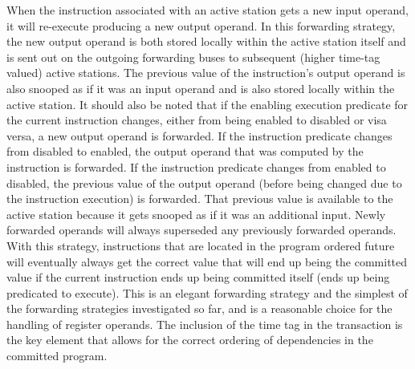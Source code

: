 \documentclass[10pt,dvips]{article}
\begin{document}
When the instruction associated with an active station gets
a new input operand, it will re-execute producing a new
output operand.  In this forwarding strategy, the new output
operand is both stored locally within the active station itself
and is sent out on the outgoing forwarding buses
to subsequent (higher time-tag valued) active stations.
The previous value of the instruction's output operand is also
snooped as if it was an input operand and is also stored locally
within the active station.
It should also be noted that if the enabling execution predicate
for the current instruction changes, either from being enabled
to disabled or visa versa, a new output operand is forwarded.
If the instruction predicate changes from disabled to enabled,
the output operand that was computed by the instruction is
forwarded.  If the instruction predicate changes from enabled
to disabled, the previous value of the output operand (before being
changed due to the instruction execution) is forwarded.
That previous value is available to the active station because
it gets snooped as if it was an additional input.
Newly forwarded operands will always superseded any previously
forwarded operands.
With this strategy, instructions that are located in the program
ordered future will eventually always get the correct
value that will end up being the committed value if the
current instruction ends up being committed itself (ends
up being predicated to execute).
This is an elegant forwarding strategy and
the simplest of the forwarding strategies investigated so far, and
is a reasonable choice for the handling of register operands.
The inclusion of the time tag in the transaction is the
key element that allows for the correct ordering of
dependencies in the committed program.
%
\end{document}
